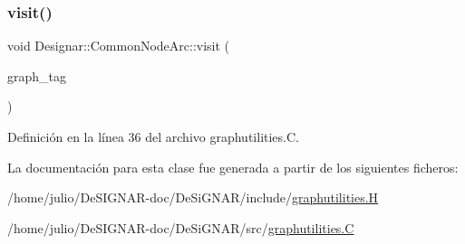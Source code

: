 \mbox{\label{class_designar_1_1_common_node_arc_a14b77740fb6d68b1949483c71dd4b197}} 
\subsubsection{\texorpdfstring{visit()}{visit()}}
{\footnotesize\ttfamily void Designar\+::\+Common\+Node\+Arc\+::visit (\begin{DoxyParamCaption}\item[{\hyperlink{namespace_designar_ac91366256ea6ea6ac5fd483d55a7499e}{Graph\+Tag}}]{graph\+\_\+tag }\end{DoxyParamCaption})}



Definición en la línea 36 del archivo graphutilities.\+C.



La documentación para esta clase fue generada a partir de los siguientes ficheros\+:\begin{DoxyCompactItemize}
\item 
/home/julio/\+De\+S\+I\+G\+N\+A\+R-\/doc/\+De\+Si\+G\+N\+A\+R/include/\hyperlink{graphutilities_8_h}{graphutilities.\+H}\item 
/home/julio/\+De\+S\+I\+G\+N\+A\+R-\/doc/\+De\+Si\+G\+N\+A\+R/src/\hyperlink{graphutilities_8_c}{graphutilities.\+C}\end{DoxyCompactItemize}
